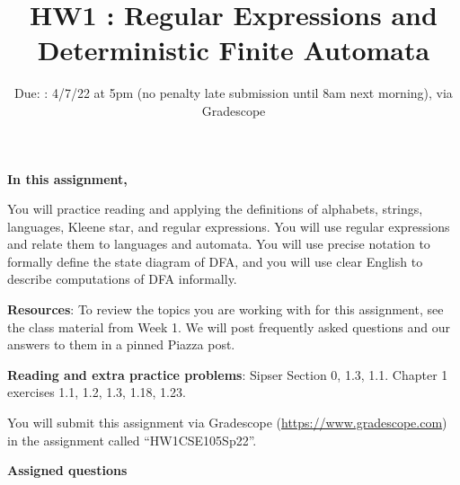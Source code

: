 

\title{HW1 : Regular Expressions and Deterministic Finite Automata}
\date{Due: : 4/7/22 at 5pm (no penalty late submission until 8am next morning), via Gradescope}



\maketitle
\thispagestyle{fancy}


{\bf In this assignment,}

You will practice reading and
applying the definitions of alphabets, strings, languages, Kleene star, and regular expressions.
You will use regular expressions and relate them to languages and automata.
You will use precise notation to formally define the state diagram of DFA,
and you will use clear English to describe computations of DFA informally.


{\bf Resources}: To review the topics you are working with 
for this assignment, see the class material from Week 1.
We will post frequently asked questions and our answers to them in a 
pinned Piazza post.

{\bf Reading and extra practice problems}: Sipser Section 0, 1.3, 1.1.
Chapter 1 exercises 1.1, 1.2, 1.3, 1.18, 1.23.

\instructions

You will submit this assignment via Gradescope
(\href{https://www.gradescope.com}{https://www.gradescope.com}) 
in the assignment called ``HW1CSE105Sp22''.



{\bf Assigned questions}

